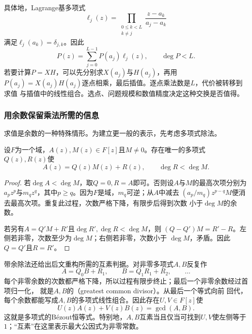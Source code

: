 具体地，Lagrange基多项式
\[
  \ell_j(z)=
  \prod_{\substack{0\leq k<L\\k\neq j}}
  \frac{z-a_k}{a_j-a_k}
\]
满足$\ell_j(a_k)=\delta_{j,k}$。因此
\begin{equation}
  P(z)=\sum_{j=0}^{L-1}P(a_j)\ell_j(z),
  \qquad \deg P<L.
  \label{eq:signal-analysis-lagrange-interpolation}
\end{equation}
若要计算$P=XH$，可以先分别求$X(a_j)$与$H(a_j)$，再用
$P(a_j)=X(a_j)H(a_j)$逐点相乘，最后插值。逐点乘法数是$L$，代价被转移到求值
与插值中的线性组合。选点、问题规模和数值精度决定这种交换是否值得。

\subsubsection{用余数保留乘法所需的信息}

求值是余数的一种特殊情形。为建立更一般的表示，先考虑多项式除法。

\begin{theorem}[多项式带余除法]
\label{thm:signal-analysis-polynomial-division}
设$F$为一个域，$A(z),M(z)\in F[z]$且$M\neq0$。存在唯一的多项式
$Q(z),R(z)$使
\[
  A(z)=Q(z)M(z)+R(z),
  \qquad \deg R<\deg M.
\]
\end{theorem}

\begin{proof}
若$\deg A<\deg M$，取$Q=0,R=A$即可。否则设$A$与$M$的最高次项分别为
$a_pz^p$与$m_qz^q$，其中$p\geq q$。因为$F$是域，$m_q$可逆；从$A$中减去
$(a_p/m_q)z^{p-q}M$便消去最高次项。重复此过程，次数严格下降，有限步后得到次数
小于$\deg M$的余数。

若另有$A=Q'M+R'$且$\deg R',\deg R<\deg M$，则
$(Q-Q')M=R'-R$。左侧若非零，次数至少为$\deg M$；右侧若非零，次数小于
$\deg M$，矛盾。因此$Q=Q'$且$R=R'$。
\end{proof}

带余除法还给出后文重构所需的互素判据。对非零多项式$A,B$反复作
\[
  A=Q_0B+R_1,\qquad
  B=Q_1R_1+R_2,\qquad \ldots
\]
每个非零余数的次数都严格下降，所以过程有限步终止；最后一个非零余数经过首项归一化，
就是$A,B$的（greatest common divisor）。从最后一个等式向前
回代，每个余数都能写成$A,B$的多项式线性组合。因此存在$U,V\in F[z]$使
\begin{equation}
  U(z)A(z)+V(z)B(z)=\gcd(A,B).
  \label{eq:signal-analysis-polynomial-bezout}
\end{equation}
这就是多项式的Bézout恒等式。特别地，$A,B$互素当且仅当可找到$U,V$使左侧等于
$1$；“互素”在这里表示最大公因式为非零常数。


